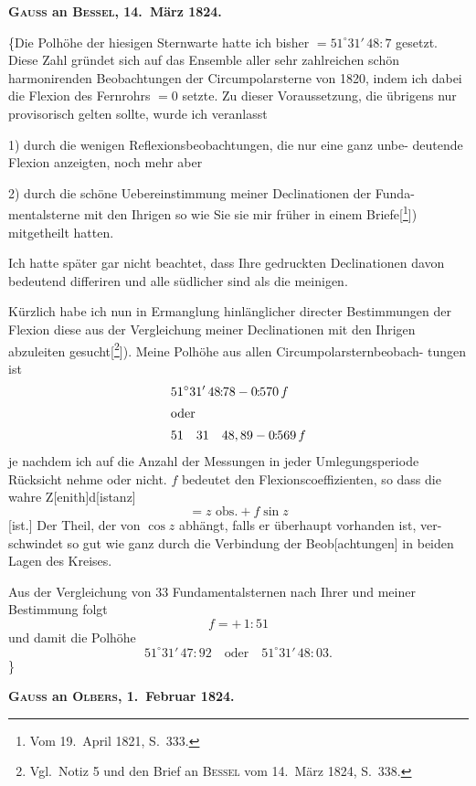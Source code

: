 \documentclass[12pt,a4paper]{article}
\theoremstyle{plain}
\theoremstyle{definition}
\theoremstyle{remark}
\begin{document}
\medskip
\begin{center}
\textbf{\textsc{Gauss} an \textsc{Bessel}, 14.\ M\"{a}rz 1824.}
\end{center}

\medskip
\{\dotfill Die Polh\"{o}he der hiesigen Sternwarte hatte ich bisher $= 51^\circ 31'\,48\!\!:\!\!7$
gesetzt. Diese Zahl gr\"{u}ndet sich auf das Ensemble aller sehr zahlreichen sch\"{o}n
harmonirenden Beobachtungen der Circumpolarsterne von 1820, indem ich
dabei die Flexion des Fernrohrs $= 0$ setzte. Zu dieser Voraussetzung, die
\"{u}brigens nur provisorisch gelten sollte, wurde ich veranlasst

1) durch die wenigen Reflexionsbeobachtungen, die nur eine ganz unbe-
deutende Flexion anzeigten, noch mehr aber

2) durch die sch\"{o}ne Uebereinstimmung meiner Declinationen der Funda-
mentalsterne mit den Ihrigen so wie Sie sie mir fr\"{u}her in einem
Briefe[\footnote{Vom 19.\ April 1821, S.\ 333.}]) mitgetheilt hatten.

Ich hatte sp\"{a}ter gar nicht beachtet, dass Ihre gedruckten Declinationen
davon bedeutend differiren und alle s\"{u}dlicher sind als die meinigen.

K\"{u}rzlich habe ich nun in Ermanglung hinl\"{a}nglicher directer Bestimmungen
der Flexion diese aus der Vergleichung meiner Declinationen mit den Ihrigen
abzuleiten gesucht[\footnote{Vgl.\ Notiz 5 und den Brief an \textsc{Bessel} vom 14.\ M\"{a}rz 1824, S.\ 338.}]). Meine Polh\"{o}he aus allen Circumpolarsternbeobach-
tungen ist
\begin{align*}
&51^\circ 31'\,48\!\!:\!\!78 - 0\!\!:\!\!570\,f \\
\intertext{oder}
&51\quad 31\quad 48,89 - 0\!\!:\!\!569\,f
\end{align*}
je nachdem ich auf die Anzahl der Messungen in jeder Umlegungsperiode
R\"{u}cksicht nehme oder nicht. $f$ bedeutet den Flexionscoeffizienten, so dass
die wahre Z[enith]d[istanz]
\[= z\text{ obs.} + f \sin z\]
[ist.] Der Theil, der von $\cos z$ abh\"{a}ngt, falls er \"{u}berhaupt vorhanden ist, ver-
schwindet so gut wie ganz durch die Verbindung der Beob[achtungen] in beiden
Lagen des Kreises.

Aus der Vergleichung von 33 Fundamentalsternen nach Ihrer und meiner
Bestimmung folgt
\[f = +\,1\!\!:\!\!51\]
und damit die Polh\"{o}he
\[51^\circ 31'\,47\!\!:\!\!92 \quad \text{oder} \quad 51^\circ 31'\,48\!\!:\!\!03.\]\}

\medskip
\begin{center}
\textbf{\textsc{Gauss} an \textsc{Olbers}, 1.\ Februar 1824.}
\end{center}
\end{document}
